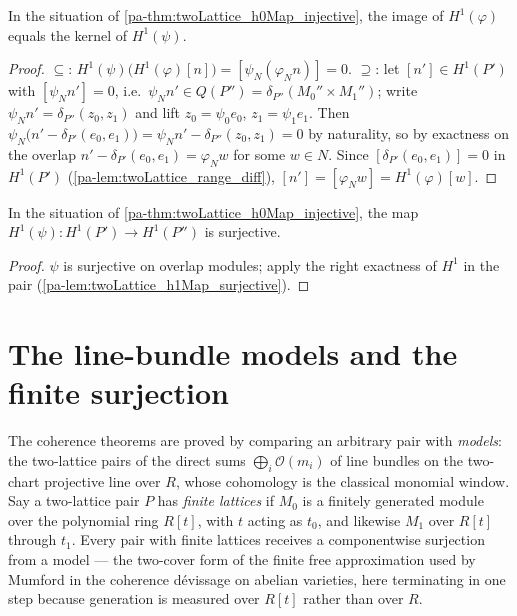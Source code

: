 \begin{theorem}
  \label{pa-thm:twoLattice_exact_h1_middle}
  \leanok

  In the situation of \ref{pa-thm:twoLattice_h0Map_injective}, the image of
  \(H^1(\varphi)\) equals the kernel of \(H^1(\psi)\).
\end{theorem}
\begin{proof}
  \leanok
  \(\subseteq\): \(H^1(\psi)\bigl(H^1(\varphi)[n]\bigr) = [\psi_N(\varphi_N n)] = 0\).
  \(\supseteq\): let \([n'] \in H^1(P')\) with \([\psi_N n'] = 0\), i.e.\
  \(\psi_N n' \in Q(P'') = \delta_{P''}(M_0'' \times M_1'')\); write
  \(\psi_N n' = \delta_{P''}(z_0, z_1)\) and lift \(z_0 = \psi_0 e_0\),
  \(z_1 = \psi_1 e_1\). Then
  \(\psi_N\bigl(n' - \delta_{P'}(e_0, e_1)\bigr) =
  \psi_N n' - \delta_{P''}(z_0, z_1) = 0\) by naturality, so by exactness on the
  overlap \(n' - \delta_{P'}(e_0,e_1) = \varphi_N w\) for some \(w \in N\). Since
  \([\delta_{P'}(e_0,e_1)] = 0\) in \(H^1(P')\) (\ref{pa-lem:twoLattice_range_diff}),
  \([n'] = [\varphi_N w] = H^1(\varphi)[w]\).
\end{proof}

\begin{theorem}
  \label{pa-thm:twoLattice_h1Map_surjective_ses}
  \leanok

  In the situation of \ref{pa-thm:twoLattice_h0Map_injective}, the map
  \(H^1(\psi) : H^1(P') \to H^1(P'')\) is surjective.
\end{theorem}
\begin{proof}
  \leanok
  \(\psi\) is surjective on overlap modules; apply the right exactness of \(H^1\) in
  the pair (\ref{pa-lem:twoLattice_h1Map_surjective}).
\end{proof}

\section{The line-bundle models and the finite surjection}
\label{pa-sec:two_lattice_models}

The coherence theorems are proved by comparing an arbitrary pair with \emph{models}: the
two-lattice pairs of the direct sums \(\bigoplus_{i} \mathcal O(m_i)\) of line bundles on
the two-chart projective line over \(R\), whose cohomology is the classical monomial
window. Say a two-lattice pair \(P\) has \emph{finite lattices} if \(M_0\) is a finitely
generated module over the polynomial ring \(R[t]\), with \(t\) acting as \(t_0\), and
likewise \(M_1\) over \(R[t]\) through \(t_1\). Every pair with finite lattices receives
a componentwise surjection from a model --- the two-cover form of the finite free
approximation used by Mumford in the coherence dévissage on abelian varieties, here
terminating in one step because generation is measured over \(R[t]\) rather than over
\(R\).

